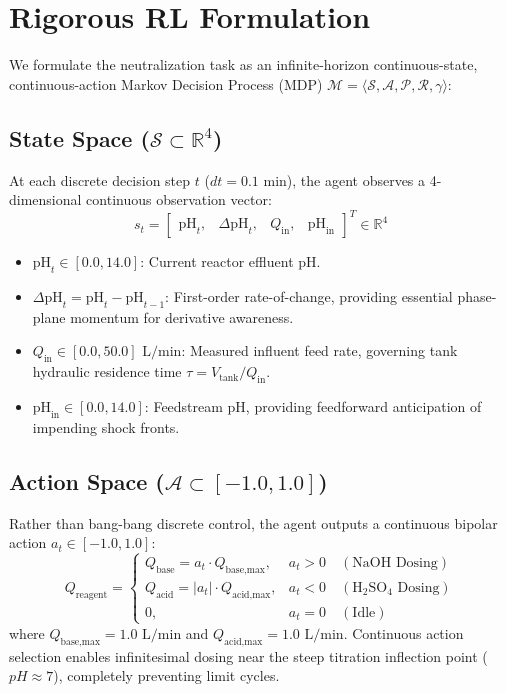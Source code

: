 \documentclass[10pt,twocolumn,a4paper]{article}
\begin{document}
\section{Rigorous RL Formulation}
We formulate the neutralization task as an infinite-horizon continuous-state, continuous-action Markov Decision Process (MDP) $\mathcal{M} = \langle \mathcal{S}, \mathcal{A}, \mathcal{P}, \mathcal{R}, \gamma \rangle$:

\subsection{State Space ($\mathcal{S} \subset \mathbb{R}^4$)}
At each discrete decision step $t$ ($dt = 0.1\text{ min}$), the agent observes a 4-dimensional continuous observation vector:
\begin{equation}
s_t = \begin{bmatrix} \text{pH}_t, & \Delta \text{pH}_t, & Q_{\text{in}}, & \text{pH}_{\text{in}} \end{bmatrix}^T \in \mathbb{R}^4
\end{equation}
\begin{itemize}
    \item $\text{pH}_t \in [0.0, 14.0]$: Current reactor effluent pH.
    \item $\Delta \text{pH}_t = \text{pH}_t - \text{pH}_{t-1}$: First-order rate-of-change, providing essential phase-plane momentum for derivative awareness.
    \item $Q_{\text{in}} \in [0.0, 50.0] \text{ L/min}$: Measured influent feed rate, governing tank hydraulic residence time $\tau = V_{\text{tank}} / Q_{\text{in}}$.
    \item $\text{pH}_{\text{in}} \in [0.0, 14.0]$: Feedstream pH, providing feedforward anticipation of impending shock fronts.
\end{itemize}

\subsection{Action Space ($\mathcal{A} \subset [-1.0, 1.0]$)}
Rather than bang-bang discrete control, the agent outputs a continuous bipolar action $a_t \in [-1.0, 1.0]$:
\begin{equation}
Q_{\text{reagent}} = 
\begin{cases}
Q_{\text{base}} = a_t \cdot Q_{\text{base,max}}, & a_t > 0 \quad (\text{NaOH Dosing}) \\
Q_{\text{acid}} = |a_t| \cdot Q_{\text{acid,max}}, & a_t < 0 \quad (\text{H}_2\text{SO}_4 \text{ Dosing}) \\
0, & a_t = 0 \quad (\text{Idle})
\end{cases}
\end{equation}
where $Q_{\text{base,max}} = 1.0\text{ L/min}$ and $Q_{\text{acid,max}} = 1.0\text{ L/min}$. Continuous action selection enables infinitesimal dosing near the steep titration inflection point ($pH \approx 7$), completely preventing limit cycles.
\end{document}
